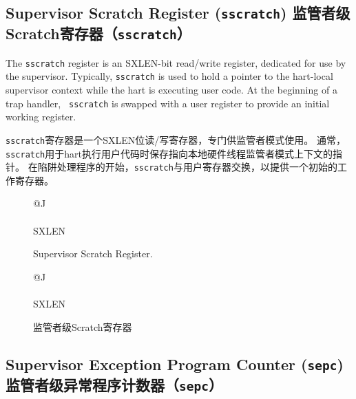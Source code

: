 \subsection{Supervisor Scratch Register ({\tt sscratch}) 监管者级Scratch寄存器（{\tt sscratch}）}
The {\tt sscratch} register is an SXLEN-bit read/write register,
dedicated for use by the supervisor.  Typically, {\tt sscratch} is
used to hold a pointer to the hart-local supervisor context while the
hart is executing user code.  At the beginning of a trap handler, {\tt
  sscratch} is swapped with a user register to provide an initial
working register.

{\tt sscratch}寄存器是一个SXLEN位读/写寄存器，专门供监管者模式使用。
通常，{\tt sscratch}用于hart执行用户代码时保存指向本地硬件线程监管者模式上下文的指针。
在陷阱处理程序的开始，{\tt sscratch}与用户寄存器交换，以提供一个初始的工作寄存器。

\begin{figure}[h!]
{\footnotesize
\begin{center}
\begin{tabular}{@{}J}
 \\
\hline
{} \\
\hline
SXLEN \\
\end{tabular}
\end{center}
}
\vspace{-0.1in}
\caption{Supervisor Scratch Register.}
\label{kregs}
\end{figure}

\begin{figure}[h!]
{\footnotesize
\begin{center}
\begin{tabular}{@{}J}
 \\
\hline
{} \\
\hline
SXLEN \\
\end{tabular}
\end{center}
}
\vspace{-0.1in}
\caption{监管者级Scratch寄存器}
\label{kregs}
\end{figure}

\subsection{Supervisor Exception Program Counter ({\tt sepc}) 监管者级异常程序计数器（{\tt sepc}）}

